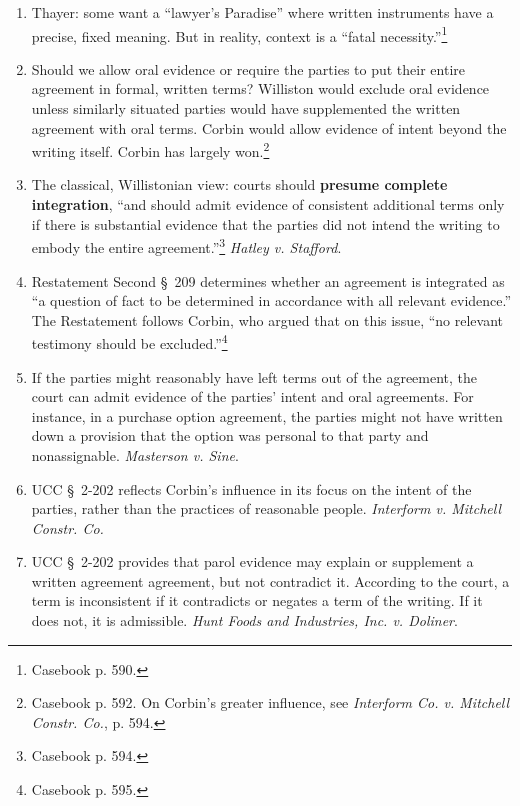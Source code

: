 \begin{enumerate}
    \item Thayer: some want a ``lawyer's Paradise'' where written instruments 
    have a precise, fixed meaning. But in reality, context is a ``fatal 
    necessity.''\footnote{Casebook p. 590.} 
    \item Should we allow oral evidence or require the parties to put their 
    entire agreement in formal, written terms? Williston would exclude oral 
    evidence unless similarly situated parties would have supplemented the 
    written agreement with oral terms. Corbin would allow evidence of intent 
    beyond the writing itself. Corbin has largely won.\footnote{Casebook p. 
    592. On Corbin's greater influence, see \emph{Interform Co. v. Mitchell 
    Constr. Co.}, p. 594.}
    \item The classical, Willistonian view: courts should \textbf{presume 
    complete integration}, ``and should admit evidence of consistent 
    additional terms only if there is substantial evidence that the parties 
    did not intend the writing to embody the entire 
    agreement.''\footnote{Casebook p. 594.} \emph{Hatley v. Stafford}.
    \item Restatement Second \S\ 209 determines whether an agreement is 
    integrated as ``a question of fact to be determined in accordance with all 
    relevant evidence.'' The Restatement follows Corbin, who argued that on 
    this issue, ``no relevant testimony should be 
    excluded.''\footnote{Casebook p. 595.}
    \item If the parties might reasonably have left terms out of the 
    agreement, the court can admit evidence of the parties' intent and oral 
    agreements. For instance, in a purchase option agreement, the parties 
    might not have written down a provision that the option was personal to 
    that party and nonassignable. \emph{Masterson v. Sine}.
    \item UCC \S\ 2-202 reflects Corbin's influence in its focus on the intent 
    of the parties, rather than the practices of reasonable people. 
    \emph{Interform v. Mitchell Constr. Co.}
    \item UCC \S\ 2-202 provides that parol evidence may explain or supplement 
    a written agreement agreement, but not contradict it. According to the 
    court, a term is inconsistent if it contradicts or negates a term of the 
    writing. If it does not, it is admissible. \emph{Hunt Foods and 
    Industries, Inc. v. Doliner}.
    \begin{enumerate}

\end{enumerate}
\end{enumerate}
